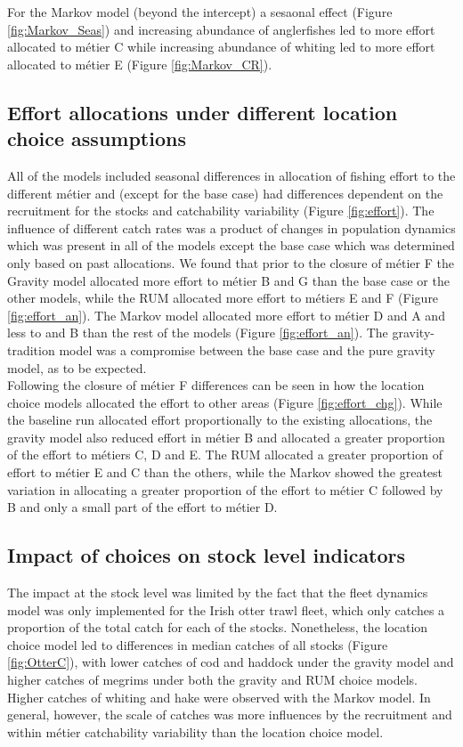 \documentclass[12pt, halfline, a4paper]{ouparticle}
\begin{document}
For the Markov model (beyond the intercept) a sesaonal effect (Figure
\ref{fig:Markov_Seas}) and increasing abundance of anglerfishes led to more
effort allocated to métier C while increasing abundance of whiting led to more
effort allocated to métier E (Figure \ref{fig:Markov_CR}).

\subsection{Effort allocations under different location choice assumptions}

All of the models included seasonal differences in allocation of fishing effort
to the different métier and (except for the base case) had differences
dependent on the recruitment for the stocks and catchability variability
(Figure \ref{fig:effort}). The influence of different catch rates was a product
of changes in population dynamics which was present in all of the models except
the base case which was determined only based on past allocations. We found
that prior to the closure of métier F the Gravity model allocated more effort
to métier B and G than the base case or the other models, while the RUM
allocated more effort to métiers E and F (Figure \ref{fig:effort_an}). The
Markov model allocated more effort to métier D and A and less to and B than the
rest of the models (Figure \ref{fig:effort_an}). The gravity-tradition model
was a compromise between the base case and the pure gravity model, as to be
expected. \\

Following the closure of métier F differences can be seen in how the location
choice models allocated the effort to other areas (Figure
\ref{fig:effort_chg}). While the baseline run allocated effort proportionally
to the existing allocations, the gravity model also reduced effort in métier B
and allocated a greater proportion of the effort to métiers C, D and E. The RUM
allocated a greater proportion of effort to métier E and C than the others,
while the Markov showed the greatest variation in allocating a greater
proportion of the effort to métier C followed by B and only a small part of the
effort to métier D.

\subsection{Impact of choices on stock level indicators}

The impact at the stock level was limited by the fact that the fleet dynamics
model was only implemented for the Irish otter trawl fleet, which only catches
a proportion of the total catch for each of the stocks. Nonetheless, the
location choice model led to differences in median catches of all stocks
(Figure \ref{fig:OtterC}), with lower catches of cod and haddock under the
gravity model and higher catches of megrims under both the gravity and RUM
choice models. Higher catches of whiting and hake were observed with the Markov
model.  In general, however, the scale of catches was more influences by the
recruitment and within métier catchability variability than the location choice
model. \\
\end{document}
